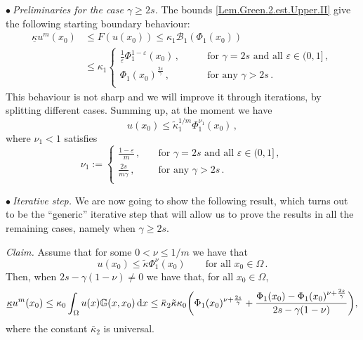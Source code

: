 \documentclass[11pt]{article}
\numberwithin{equation}{section}
\newcommand{\dx}{\,{\rm d}x}
\newcommand{\n}{F}
\newcommand{\kb}{\underline{\kappa}}
\newcommand{\K}{{\mathbb G}}
\newcommand{\B}{\mathcal{B}}
\begin{document}
\noindent$\bullet~$\textit{Preliminaries for the case $\gamma\ge 2s$. }The bounds \eqref{Lem.Green.2.est.Upper.II} give the following starting boundary behaviour:
\begin{equation}\label{Step.0.2.Lem.Green.2}\begin{split}
\kb u^m(x_0)&\le \n(u(x_0))
 \le   \kappa_1 \B_1(\Phi_1(x_0))\\
&\le  \kappa_1
\left\{\begin{array}{lll}
\frac{1}{\varepsilon}\Phi_1^{1-\varepsilon}(x_0)\,, & \qquad\mbox{for $\gamma =2s$ and all $\varepsilon\in (0,1]$}\,,\\[2mm]
\Phi_1(x_0)^{\frac{2s}{\gamma}}\,, & \qquad\mbox{for any }\gamma >2s\,.\\
\end{array}\right.
\end{split}
\end{equation}
This behaviour is not sharp and we will improve it through iterations, by splitting different cases. Summing up, at the moment we have
\begin{equation}\label{Step.0.3.Lem.Green.2}
u(x_0)\le \tilde\kappa_1^{1/m}\Phi_1^{\nu_1}(x_0)\,,
\end{equation}
where $\nu_1<1$ satisfies
\begin{equation}\label{Step.0.4.Lem.Green.2}
\nu_1:=\left\{\begin{array}{lll}
\frac{1-\varepsilon}{m}\,, & \quad\mbox{for $\gamma =2s$ and all $\varepsilon\in (0,1]$}\,,\\[2mm]
\frac{2s}{m\gamma}\,, & \quad\mbox{for any }\gamma >2s\,.\\
\end{array}\right.
\end{equation}

\noindent$\bullet~$\textit{Iterative step. }We are now going to show the following result, which turns out to be the ``generic'' iterative step that will allow us to prove the results in all the remaining cases, namely when $\gamma\ge 2s$.

\noindent\textsl{Claim. }Assume that for some $0<\nu\leq 1/m$ we have that
\begin{equation}\label{Step.01.hyp.nu}
u(x_0)\le \tilde\kappa\Phi_1^{\nu}(x_0)\qquad\mbox{for all $x_0\in\Omega$}\,.
\end{equation}
Then, when $2s-\gamma(1-\nu)\neq 0$ we have that, for all $x_0\in\Omega$,
\begin{equation}\label{Step.01.claim.nu}
\kb u^{m}(x_0) \le \kappa_0  \int_{\Omega}  u(x)  \K(x,x_0)\dx \leq \bar \kappa_2 \tilde\kappa \kappa_0\biggl(\Phi_1(x_0)^{\nu+\frac{2s}{\gamma}}+ \frac{\Phi_1(x_0) - \Phi_1(x_0)^{\nu+\frac{2s}{\gamma}}}{2s-\gamma(1-\nu)}\biggr),
\end{equation}
where the constant $\bar \kappa_2$ is universal.
\end{document}

